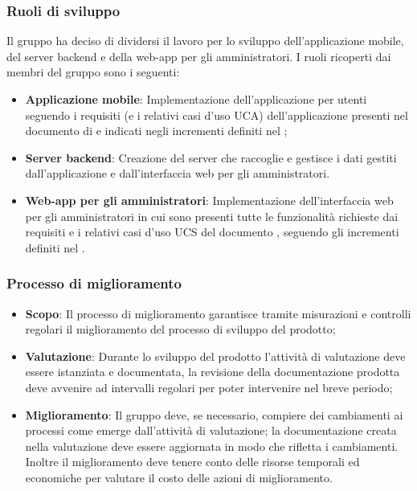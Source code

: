 \subsubsection{Ruoli di sviluppo}
Il gruppo ha deciso di dividersi il lavoro per lo sviluppo dell'applicazione mobile, del server backend e della web-app per gli amministratori. 
I ruoli ricoperti dai membri del gruppo sono i seguenti:
\begin{itemize}
	\item \textbf{Applicazione mobile}: Implementazione dell'applicazione per utenti seguendo i requisiti (e i relativi casi d'uso UCA) dell'applicazione presenti nel documento di \AdR{} e indicati negli incrementi definiti nel \PdP{};
	\item \textbf{Server backend}: Creazione del server che raccoglie e gestisce i dati gestiti dall'applicazione e dall'interfaccia web per gli amministratori.
	\item \textbf{Web-app per gli amministratori}: Implementazione dell'interfaccia web per gli amministratori in cui sono presenti tutte le funzionalità richieste dai requisiti e i relativi casi d'uso UCS del documento \AdR{}, seguendo gli incrementi definiti nel \PdP{}.
\end{itemize}

\subsubsection{Processo di miglioramento}
\begin{itemize}
\item \textbf{Scopo}: Il processo di miglioramento garantisce tramite misurazioni e controlli regolari il miglioramento del processo di sviluppo del prodotto;

\item \textbf{Valutazione}: Durante lo sviluppo del prodotto l'attività di valutazione deve essere istanziata e documentata, la revisione della documentazione prodotta deve avvenire ad intervalli regolari per poter intervenire nel breve periodo;

\item \textbf{Miglioramento}: Il gruppo deve, se necessario, compiere dei cambiamenti ai processi come emerge dall'attività di valutazione; la documentazione creata nella valutazione deve essere aggiornata in modo che rifletta i cambiamenti.\\
Inoltre il miglioramento deve tenere conto delle risorse temporali ed economiche per valutare il costo delle azioni di miglioramento.
\end{itemize}


